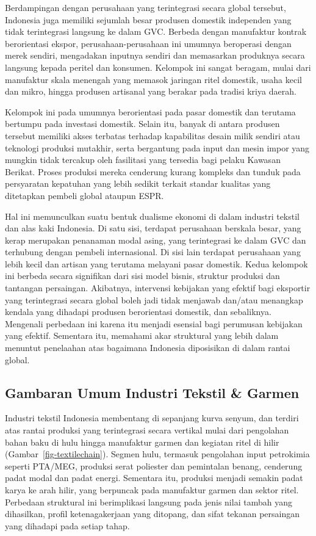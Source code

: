 \documentclass[
  manuscript=article,
  layout=publish,
  year=2026,
  volume=1,
]{den}
\begin{document}
Berdampingan dengan perusahaan yang terintegrasi secara global tersebut,
Indonesia juga memiliki sejumlah besar produsen domestik independen yang
tidak terintegrasi langsung ke dalam GVC. Berbeda dengan manufaktur
kontrak berorientasi ekspor, perusahaan-perusahaan ini umumnya
beroperasi dengan merek sendiri, mengadakan inputnya sendiri dan
memasarkan produknya secara langsung kepada peritel dan konsumen.
Kelompok ini sangat beragam, mulai dari manufaktur skala menengah yang
memasok jaringan ritel domestik, usaha kecil dan mikro, hingga produsen
artisanal yang berakar pada tradisi kriya daerah.

Kelompok ini pada umumnya berorientasi pada pasar domestik dan terutama
bertumpu pada investasi domestik. Selain itu, banyak di antara produsen
tersebut memiliki akses terbatas terhadap kapabilitas desain milik
sendiri atau teknologi produksi mutakhir, serta bergantung pada input
dan mesin impor yang mungkin tidak tercakup oleh fasilitasi yang
tersedia bagi pelaku Kawasan Berikat. Proses produksi mereka cenderung
kurang kompleks dan tunduk pada persyaratan kepatuhan yang lebih sedikit
terkait standar kualitas yang ditetapkan pembeli global ataupun ESPR.

Hal ini memunculkan suatu bentuk dualisme ekonomi di dalam industri
tekstil dan alas kaki Indonesia. Di satu sisi, terdapat perusahaan
berskala besar, yang kerap merupakan penanaman modal asing, yang
terintegrasi ke dalam GVC dan terhubung dengan pembeli internasional. Di
sisi lain terdapat perusahaan yang lebih kecil dan artisan yang terutama
melayani pasar domestik. Kedua kelompok ini berbeda secara signifikan
dari sisi model bisnis, struktur produksi dan tantangan persaingan.
Akibatnya, intervensi kebijakan yang efektif bagi eksportir yang
terintegrasi secara global boleh jadi tidak menjawab dan/atau menangkap
kendala yang dihadapi produsen berorientasi domestik, dan sebaliknya.
Mengenali perbedaan ini karena itu menjadi esensial bagi perumusan
kebijakan yang efektif. Sementara itu, memahami akar struktural yang
lebih dalam menuntut penelaahan atas bagaimana Indonesia diposisikan di
dalam rantai global.

\subsection{Gambaran Umum Industri Tekstil \&
Garmen}\label{gambaran-umum-industri-tekstil-garmen}

Industri tekstil Indonesia membentang di sepanjang kurva senyum, dan
terdiri atas rantai produksi yang terintegrasi secara vertikal mulai
dari pengolahan bahan baku di hulu hingga manufaktur garmen dan kegiatan
ritel di hilir (Gambar~\ref{fig-textilechain}). Segmen hulu, termasuk
pengolahan input petrokimia seperti PTA/MEG, produksi serat poliester
dan pemintalan benang, cenderung padat modal dan padat energi. Sementara
itu, produksi menjadi semakin padat karya ke arah hilir, yang berpuncak
pada manufaktur garmen dan sektor ritel. Perbedaan struktural ini
berimplikasi langsung pada jenis nilai tambah yang dihasilkan, profil
ketenagakerjaan yang ditopang, dan sifat tekanan persaingan yang
dihadapi pada setiap tahap.
\end{document}
